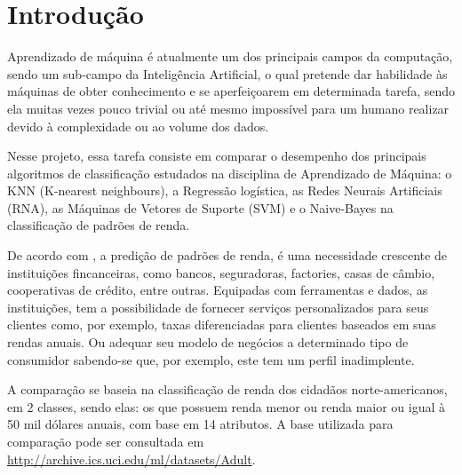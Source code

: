 \section{Introdução}
Aprendizado de máquina é atualmente um dos principais campos da computação, sendo um sub-campo da Inteligência Artificial, o qual pretende dar habilidade às máquinas de obter conhecimento e se aperfeiçoarem em determinada tarefa, sendo ela muitas vezes pouco trivial ou até mesmo impossível para um humano realizar devido à complexidade ou ao volume dos dados.

Nesse projeto, essa tarefa consiste em comparar o desempenho dos principais algoritmos de classificação estudados na disciplina de Aprendizado de Máquina: o KNN (K-nearest neighbours), a Regressão logística, as Redes Neurais Artificiais (RNA), as Máquinas de Vetores de Suporte (SVM) e o Naive-Bayes na classificação de padrões de renda.

De acordo com \cite{importance}, a predição de padrões de renda, é uma necessidade crescente de instituições fincanceiras, como bancos, seguradoras, factories, casas de câmbio, cooperativas de crédito, entre outras. Equipadas com ferramentas e dados, as instituições, tem a possibilidade de fornecer serviços personalizados para seus clientes como, por exemplo, taxas diferenciadas para clientes baseados em suas rendas anuais. Ou adequar seu modelo de negócios a determinado  tipo de consumidor sabendo-se que, por exemplo, este tem um perfil inadimplente.

A comparação se baseia na classificação de renda dos cidadãos norte-americanos, em 2 classes, sendo elas: os que possuem renda menor ou renda maior ou igual à 50 mil dólares anuais, com base em 14 atributos. A base utilizada para comparação pode ser consultada em \url{http://archive.ics.uci.edu/ml/datasets/Adult}. 